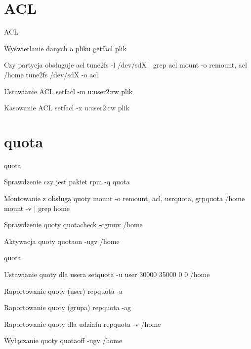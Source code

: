 \documentclass[xcolor=dvipsnames]{beamer}
\begin{document}
\section{ACL}
\begin{frame}{ACL}
\begin{block}{Wyświetlanie danych o pliku}
getfacl plik
\end{block}
\pause
\begin{block}{Czy partycja obsługuje acl}
tune2fs -l /dev/sdX | grep acl
\newline
mount -o remount, acl /home
\newline
tune2fs /dev/sdX -o acl
\end{block}
\pause
\begin{block}{Ustawianie ACL}
setfacl -m u:user2:rw plik
\end{block}
\pause
\begin{block}{Kasowanie ACL}
setfacl -x u:user2:rw plik
\end{block}
\end{frame}
\section{quota}
\begin{frame}{quota}
\begin{block}{Sprawdzenie czy jest pakiet}
rpm -q quota
\end{block}
\pause
\begin{block}{Montowanie z obsługą quoty}
mount -o remount, acl, usrquota, grpquota /home
\newline
mount -v | grep home
\end{block}
\pause
\begin{block}{Sprawdzenie quoty}
quotacheck -cgmuv /home
\end{block}
\pause
\begin{block}{Aktywacja quoty}
quotaon -ugv /home
\end{block}
\end{frame}
\begin{frame}{quota}
\begin{block}{Ustawianie quoty dla usera}
setquota -u user 30000 35000 0 0 /home
\end{block}
\pause
\begin{block}{Raportowanie quoty (user)}
repquota -a
\end{block}
\pause
\begin{block}{Raportowanie quoty (grupa)}
repquota -ag
\end{block}
\pause
\begin{block}{Raportowanie quoty dla udziału}
repquota -v /home
\end{block}
\pause
\begin{block}{Wyłączanie quoty}
quotaoff -ugv /home
\end{block}
\end{frame}
\end{document}
